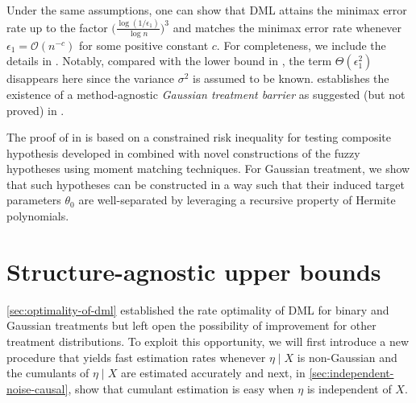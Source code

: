 \documentclass{article}
\def\eps{{\epsilon}}
\def\gO{{\mathcal{O}}}
\newcommand{\textfrac}[2]{{\textstyle\frac{#1}{#2}}}
\begin{document}
Under the same assumptions, one can show that DML attains the minimax error rate up to the factor $\big(\textfrac{\log(1/\eps_1)}{\log n}\big)^3$ and matches the minimax error rate whenever $\eps_1 = \gO(n^{-c})$ for some positive constant $c$. 
For completeness, we include the details in . %
Notably, compared with the lower bound in , the term $\Theta(\epsilon_1^2)$ disappears here since the variance $\sigma^2$ is assumed to be known.   establishes the existence of a method-agnostic \emph{Gaussian treatment barrier} as suggested (but not proved) in \citet{mackey2018orthogonal}.

The proof of  in  is based on a constrained risk inequality for testing composite hypothesis developed in \citet{cai2011testing}  combined with novel constructions of the fuzzy hypotheses using moment matching techniques. For Gaussian treatment, we show that such hypotheses can be constructed in a way such that their induced target parameters $\theta_0$ are well-separated by leveraging a recursive property of Hermite polynomials.

%
%
%
%
%
%

%
%
%
%

%

%

%
%
%
%
%
%
%
%
%
%
%
%
%
%
%

%
%
%
%
%
%
%
%
%
%
%

%
%

%
\section{Structure-agnostic upper bounds} %
\label{sec:upper-bounds}

%

%


%
%
%
%
%
%
%
%
%
%
%
%
%
%
%
%
%
%
%
%
%
%
%
%
%

%
%
%
%
%
%

%
%
%
%
%
%
%
%
%
%
%
%
%
%
%
%
%
%


%
%
%
%
%

%
%
%

%
%
%
%

\cref{sec:optimality-of-dml} established the rate optimality of DML for binary and Gaussian treatments but left open the possibility of improvement for other treatment distributions. 
To exploit this opportunity, we will first introduce a new procedure that yields fast estimation rates whenever $\eta \mid X$ is non-Gaussian and the cumulants of $\eta \mid X$ are estimated accurately and next, in \cref{sec:independent-noise-causal}, show that cumulant estimation is easy when $\eta$ is independent of $X$.
\end{document}
